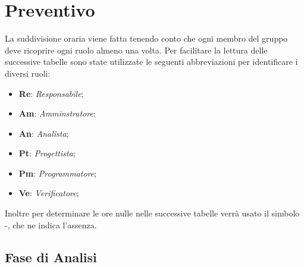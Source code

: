 \section{Preventivo}
La suddivisione oraria viene fatta tenendo conto che ogni  membro del gruppo deve ricoprire ogni ruolo almeno una volta.
Per facilitare la lettura delle successive tabelle sono state utilizzate le seguenti abbreviazioni per identificare i diversi ruoli:
\begin{itemize}
	\item \textbf{Re}: \textit{Responsabile};
	\item \textbf{Am}: \textit{Amminstratore};
	\item \textbf{An}: \textit{Analista};
	\item \textbf{Pt}: \textit{Progettista};
	\item \textbf{Pm}: \textit{Programmatore};
	\item \textbf{Ve}: \textit{Verificatore};
\end{itemize}
Inoltre per determinare le ore nulle nelle successive tabelle verrà usato il simbolo -, che ne indica l'assenza.

\subsection{Fase di Analisi}
